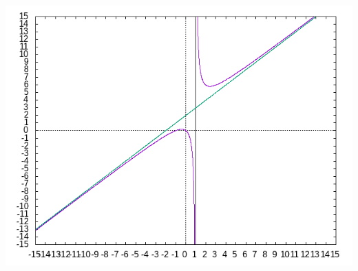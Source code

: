 \documentclass[11pt]{scrartcl}
\begin{document}
\begin{enumerate}
\begin{center}
				\includegraphics[scale=0.6]{funkcja1}
			\end{center}

	\end{enumerate}
\end{document}
